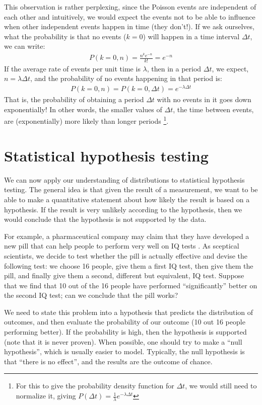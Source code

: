 This observation is rather perplexing, since the Poisson events are independent of each other and intuitively, we would expect the  events not to be able to influence when other independent events happen in time (they don't!). If we ask ourselves, what the probability is that no events ($k=0$) will happen in a time interval $\Delta t$, we can write:
\begin{align}
 P(k=0,n)=\frac{n^k e^{-n}}{k!} =e^{-n}
\end{align}
If the average rate of events per unit time is $\lambda$, then in a period $\Delta t$, we expect, $n=\lambda\Delta t$, and the probability of no events happening in that period is:
\begin{align}
 P(k=0,n)=P(k=0,\Delta t)= e^{-\lambda \Delta t}
\end{align}
That is, the probability of obtaining a period $\Delta t$ with no events in it goes down exponentially! In other words, the smaller values of $\Delta t$, the time between events, are (exponentially) more likely than longer periods \footnote{For this to give the probability density function for $\Delta t$, we would still need to normalize it, giving $P(\Delta t)=\frac{1}{\lambda}e^{-\lambda \Delta t}$}.

\section{Statistical hypothesis testing}
We can now apply our understanding of distributions to statistical hypothesis testing. The general idea is that given the result of a measurement, we want to be able to make a quantitative statement about how likely the result is based on a hypothesis. If the result is very unlikely according to the hypothesis, then we would conclude that the hypothesis is not supported by the data. 

For example, a pharmaceutical company may claim that they have developed a new pill that can help people to perform very well on IQ tests . As sceptical scientists, we decide to test whether the pill is actually effective and devise the following test: we choose 16 people, give them a first IQ test, then give them the pill, and finally give them a second, different but equivalent, IQ test. Suppose that we find that 10 out of the 16 people have performed ``significantly'' better on the second IQ test; can we conclude that the pill works?

We need to state this problem into a hypothesis that predicts the distribution of outcomes, and then evaluate the probability of our outcome (10 out 16 people performing better). If the probability is high, then the hypothesis is supported (note that it is never proven). When possible, one should try to make a ``null hypothesis'', which is usually easier to model. Typically, the null hypothesis is that ``there is no effect'', and the results are the outcome of chance.

